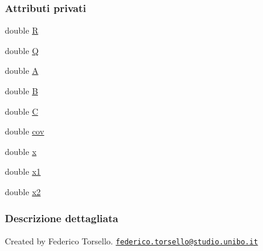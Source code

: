 \subsubsection*{Attributi privati}
\begin{DoxyCompactItemize}
\item 
double \hyperlink{classit_1_1unibo_1_1torsello_1_1bluetoothpositioning_1_1filters_1_1kalmanFilter_1_1KFilter_ac5b2a95b9934717adadb214003d7e7bc_ac5b2a95b9934717adadb214003d7e7bc}{R}
\item 
double \hyperlink{classit_1_1unibo_1_1torsello_1_1bluetoothpositioning_1_1filters_1_1kalmanFilter_1_1KFilter_a214fff6f5bc8eed06a7be5000d4ccfef_a214fff6f5bc8eed06a7be5000d4ccfef}{Q}
\item 
double \hyperlink{classit_1_1unibo_1_1torsello_1_1bluetoothpositioning_1_1filters_1_1kalmanFilter_1_1KFilter_a761ff20b52df6e05a2cf023d793e3cc2_a761ff20b52df6e05a2cf023d793e3cc2}{A}
\item 
double \hyperlink{classit_1_1unibo_1_1torsello_1_1bluetoothpositioning_1_1filters_1_1kalmanFilter_1_1KFilter_adde4f664a3dd2e0c1f2c378b3d28c3da_adde4f664a3dd2e0c1f2c378b3d28c3da}{B}
\item 
double \hyperlink{classit_1_1unibo_1_1torsello_1_1bluetoothpositioning_1_1filters_1_1kalmanFilter_1_1KFilter_a67a040dd80123bdb5393070b299fc2bf_a67a040dd80123bdb5393070b299fc2bf}{C}
\item 
double \hyperlink{classit_1_1unibo_1_1torsello_1_1bluetoothpositioning_1_1filters_1_1kalmanFilter_1_1KFilter_a0a5121231c91117dddcdd9aa11e6be3a_a0a5121231c91117dddcdd9aa11e6be3a}{cov}
\item 
double \hyperlink{classit_1_1unibo_1_1torsello_1_1bluetoothpositioning_1_1filters_1_1kalmanFilter_1_1KFilter_ad07c13a7c5d92b40ff76743a8734014b_ad07c13a7c5d92b40ff76743a8734014b}{x}
\item 
double \hyperlink{classit_1_1unibo_1_1torsello_1_1bluetoothpositioning_1_1filters_1_1kalmanFilter_1_1KFilter_a18787a3e158476e584bd39d10b944f85_a18787a3e158476e584bd39d10b944f85}{x1}
\item 
double \hyperlink{classit_1_1unibo_1_1torsello_1_1bluetoothpositioning_1_1filters_1_1kalmanFilter_1_1KFilter_a47a49df3a17886229a33cf468029b477_a47a49df3a17886229a33cf468029b477}{x2}
\end{DoxyCompactItemize}


\subsubsection{Descrizione dettagliata}
Created by Federico Torsello. \href{mailto:federico.torsello@studio.unibo.it}{\tt federico.\+torsello@studio.\+unibo.\+it} 

